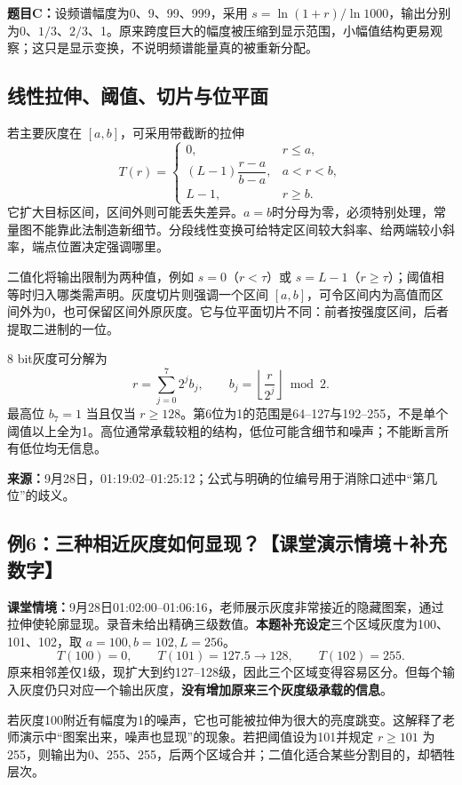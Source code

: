 \textbf{题目C：}设频谱幅度为0、9、99、999，采用 $s=\ln(1+r)/\ln1000$，输出分别为0、$1/3$、$2/3$、1。原来跨度巨大的幅度被压缩到显示范围，小幅值结构更易观察；这只是显示变换，不说明频谱能量真的被重新分配。

\subsection{线性拉伸、阈值、切片与位平面}
若主要灰度在 $[a,b]$，可采用带截断的拉伸
\begin{equation}
T(r)=\begin{cases}
0,&r\leq a,\\
(L-1)\dfrac{r-a}{b-a},&a<r<b,\\
L-1,&r\geq b.
\end{cases}
\end{equation}
它扩大目标区间，区间外则可能丢失差异。$a=b$时分母为零，必须特别处理，常量图不能靠此法制造新细节。分段线性变换可给特定区间较大斜率、给两端较小斜率，端点位置决定强调哪里。

二值化将输出限制为两种值，例如 $s=0$（$r<\tau$）或 $s=L-1$（$r\geq\tau$）；阈值相等时归入哪类需声明。灰度切片则强调一个区间 $[a,b]$，可令区间内为高值而区间外为0，也可保留区间外原灰度。它与位平面切片不同：前者按强度区间，后者提取二进制的一位。

8 bit灰度可分解为
\[
r=\sum_{j=0}^{7}2^jb_j,\qquad b_j=\left\lfloor\frac{r}{2^j}\right\rfloor\bmod2.
\]
最高位 $b_7=1$ 当且仅当 $r\geq128$。第6位为1的范围是64--127与192--255，不是单个阈值以上全为1。高位通常承载较粗的结构，低位可能含细节和噪声；不能断言所有低位均无信息。

\noindent\textbf{来源：}9月28日，01:19:02--01:25:12；公式与明确的位编号用于消除口述中“第几位”的歧义。

\subsection{例6：三种相近灰度如何显现？【课堂演示情境＋补充数字】}
\textbf{课堂情境：}9月28日01:02:00--01:06:16，老师展示灰度非常接近的隐藏图案，通过拉伸使轮廓显现。录音未给出精确三级数值。\textbf{本题补充设定}三个区域灰度为100、101、102，取 $a=100,b=102,L=256$。
\[
T(100)=0,\qquad T(101)=127.5\longrightarrow128,\qquad T(102)=255.
\]
原来相邻差仅1级，现扩大到约127--128级，因此三个区域变得容易区分。但每个输入灰度仍只对应一个输出灰度，\textbf{没有增加原来三个灰度级承载的信息}。

若灰度100附近有幅度为1的噪声，它也可能被拉伸为很大的亮度跳变。这解释了老师演示中“图案出来，噪声也显现”的现象。若把阈值设为101并规定 $r\geq101$ 为255，则输出为0、255、255，后两个区域合并；二值化适合某些分割目的，却牺牲层次。

